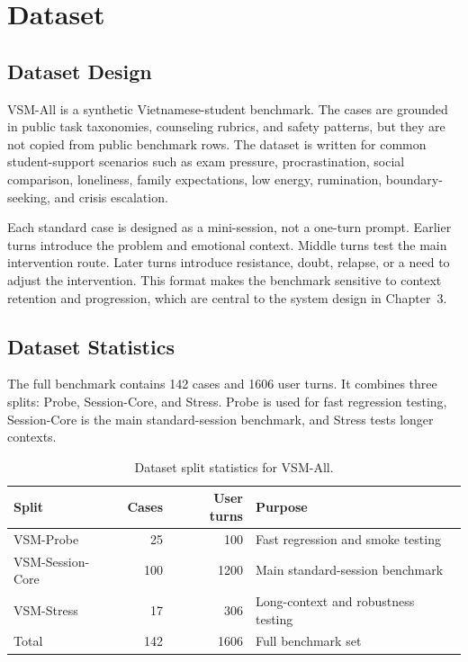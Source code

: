 \section{Dataset}

\subsection{Dataset Design}

VSM-All is a synthetic Vietnamese-student benchmark. The cases are grounded in public task taxonomies, counseling rubrics, and safety patterns, but they are not copied from public benchmark rows. The dataset is written for common student-support scenarios such as exam pressure, procrastination, social comparison, loneliness, family expectations, low energy, rumination, boundary-seeking, and crisis escalation.

Each standard case is designed as a mini-session, not a one-turn prompt. Earlier turns introduce the problem and emotional context. Middle turns test the main intervention route. Later turns introduce resistance, doubt, relapse, or a need to adjust the intervention. This format makes the benchmark sensitive to context retention and progression, which are central to the system design in Chapter~3.

\subsection{Dataset Statistics}

The full benchmark contains 142 cases and 1606 user turns. It combines three splits: Probe, Session-Core, and Stress. Probe is used for fast regression testing, Session-Core is the main standard-session benchmark, and Stress tests longer contexts.

\begin{table}[H]
\centering
\caption{Dataset split statistics for VSM-All.}
\label{tab:vsm_split_stats}
\small
\begin{tabular}{@{}p{}rrp{}@{}}
\toprule
Split & Cases & User turns & Purpose \\
\midrule
VSM-Probe & 25 & 100 & Fast regression and smoke testing \\
VSM-Session-Core & 100 & 1200 & Main standard-session benchmark \\
VSM-Stress & 17 & 306 & Long-context and robustness testing \\
\midrule
Total & 142 & 1606 & Full benchmark set \\
\bottomrule
\end{tabular}
\end{table}

